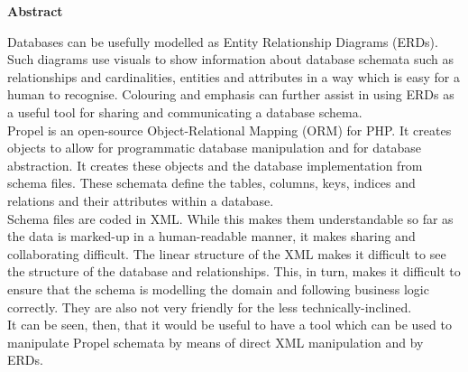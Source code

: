 \thispagestyle{empty}

\begin{center}
    {\LARGE\bf Abstract}
\end{center}

Databases can be usefully modelled as Entity Relationship Diagrams (ERDs). Such diagrams use visuals to show information about database schemata such as relationships and cardinalities, entities and attributes in a way which is easy for a human to recognise. Colouring and emphasis can further assist in using ERDs as a useful tool for sharing and communicating a database schema.
\\

Propel is an open-source Object-Relational Mapping (ORM) for PHP. It creates objects to allow for programmatic database manipulation and for database abstraction. It creates these objects and the database implementation from schema files. These schemata define the tables, columns, keys, indices and relations and their attributes within a database.
\\

Schema files are coded in XML. While this makes them understandable so far as the data is marked-up in a human-readable manner, it makes sharing and collaborating difficult. The linear structure of the XML makes it difficult to see the structure of the database and relationships. This, in turn, makes it difficult to ensure that the schema is modelling the domain and following business logic correctly. They are also not very friendly for the less technically-inclined.
\\

It can be seen, then, that it would be useful to have a tool which can be used to manipulate Propel schemata by means of direct XML manipulation and by ERDs.